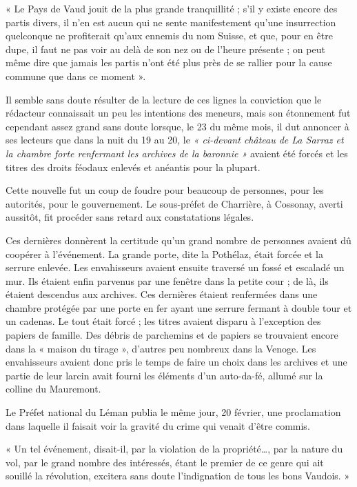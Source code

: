 \documentclass[french,twoside]{book} %
\newenvironment{quoteblock}%
  {\begin{quoting}}
  {\end{quoting}}
\newenvironment{quotebar}{%
    \def\FrameCommand{{\color{rubric!10!}\vrule width 0.5em} \hspace{0.9em}}%
    \def\OuterFrameSep{\itemsep} %
    \MakeFramed {\advance\hsize-\width \FrameRestore}
  }%
  {%
    \endMakeFramed
  }
\renewenvironment{quoteblock}%
  {%
    \savenotes
    \setstretch{0.9}
    \begin{quotebar}
  }
  {%
    \end{quotebar}
    \spewnotes
  }
\begin{document}
\begin{quoteblock}
 \noindent « Le Pays de Vaud jouit de la plus grande tranquillité ; s’il y existe encore des partis divers, il n’en est aucun qui ne sente manifestement qu’une insurrection quelconque ne profiterait qu’aux ennemis du nom Suisse, et que, pour en être dupe, il faut ne pas voir au delà de son nez ou de l’heure présente ; on peut même dire que jamais les partis n’ont été plus près de se rallier pour la cause commune que dans ce moment ».
 \end{quoteblock}

\noindent Il semble sans doute résulter de la lecture de ces lignes la conviction que le rédacteur connaissait un peu les intentions des meneurs, mais son étonnement fut cependant assez grand sans doute lorsque, le 23 du même mois, il dut annoncer à ses lecteurs que dans la nuit du 19 au 20, le \emph{« ci-devant château de La Sarraz et la chambre forte renfermant les archives de la baronnie »} avaient été forcés et les titres des droits féodaux enlevés et anéantis pour la plupart.\par
Cette nouvelle fut un coup de foudre pour beaucoup de personnes, pour les autorités, pour le gouvernement. Le sous-préfet de Charrière, à Cossonay, averti aussitôt, fit procéder sans retard aux constatations légales.\par
Ces dernières donnèrent la certitude qu’un grand nombre de personnes avaient dû coopérer à l’événement. La grande porte, dite la Pothélaz, était forcée et la serrure enlevée. Les envahisseurs avaient ensuite traversé un fossé et escaladé un mur. Ils étaient enfin parvenus par une fenêtre dans la petite cour ; de là, ils étaient descendus aux archives. Ces dernières étaient renfermées dans une chambre protégée par une porte en fer ayant une serrure fermant à double tour et un cadenas. Le tout était forcé ; les titres avaient disparu à l’exception des papiers de famille. Des débris de parchemins et de papiers se trouvaient encore dans la « maison du tirage », d’autres peu nombreux dans la Venoge. Les envahisseurs avaient donc pris le temps de faire un choix dans les archives et une partie de leur larcin avait fourni les éléments d’un auto-da-fé, allumé sur la colline du Mauremont.\par
Le Préfet national du Léman publia le même jour, 20 février, une proclamation dans laquelle il faisait voir la gravité du crime qui venait d’être commis.\par

\begin{quoteblock}
\noindent « Un tel événement, disait-il, par la violation de la propriété…, par la nature du vol, par le grand nombre des intéressés, étant le premier de ce genre qui ait souillé la révolution, excitera sans doute l’indignation de tous les bons Vaudois. »\end{quoteblock}
\end{document}
